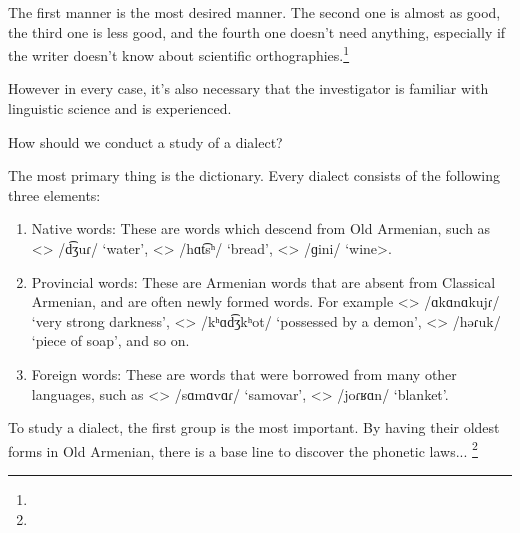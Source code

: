 The first manner is the most desired manner. The second one is almost as good, the third one is less good, and the fourth one doesn't need anything, especially if the writer doesn't know about scientific orthographies.\footnote{}

However in every case, it's also necessary that the investigator is familiar with linguistic science and is experienced. 

How should we conduct a study of a dialect?

The most primary thing is the dictionary. Every dialect consists of the following three elements:
\begin{enumerate}
	\item Native words: These are words which descend from Old Armenian, such as <> /d͡ʒuɾ/ `water', <> /hɑt͡sʰ/ `bread', <> /ɡini/ `wine>.
	\item Provincial words: These are Armenian words that are absent from Classical Armenian, and are often newly formed words. For example <> /ɑkɑnɑkujɾ/ `very strong darkness', <> /kʰɑd͡ʒkʰot/ `possessed by a demon', <> /həɾuk/ `piece of soap', and so on. 
	\item Foreign words: These are words that were borrowed from many other languages, such as <> /sɑmɑvɑɾ/ `samovar', <> /joɾʁɑn/ `blanket'.
\end{enumerate}

To study a dialect, the first group is the most important. By having their oldest forms in Old Armenian, there is a base line to discover the phonetic laws... \footnote{} 



\begin{adjarianpage}\label{page:12}\end{adjarianpage}%


